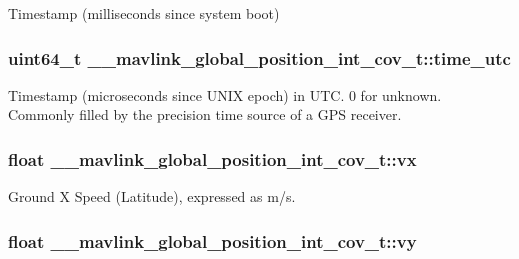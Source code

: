 Timestamp (milliseconds since system boot) 

\hypertarget{struct____mavlink__global__position__int__cov__t_af33a529c45f0078ac50c0af3d6fcc5c9}{
\subsubsection[{time\+\_\+utc}]{\setlength{\rightskip}{0pt plus 5cm}uint64\+\_\+t \+\_\+\+\_\+mavlink\+\_\+global\+\_\+position\+\_\+int\+\_\+cov\+\_\+t\+::time\+\_\+utc}}\label{struct____mavlink__global__position__int__cov__t_af33a529c45f0078ac50c0af3d6fcc5c9}


Timestamp (microseconds since U\+N\+I\+X epoch) in U\+T\+C. 0 for unknown. Commonly filled by the precision time source of a G\+P\+S receiver. 

\hypertarget{struct____mavlink__global__position__int__cov__t_af5385abecc85392ad2428fa2e96c1da5}{
\subsubsection[{vx}]{\setlength{\rightskip}{0pt plus 5cm}float \+\_\+\+\_\+mavlink\+\_\+global\+\_\+position\+\_\+int\+\_\+cov\+\_\+t\+::vx}}\label{struct____mavlink__global__position__int__cov__t_af5385abecc85392ad2428fa2e96c1da5}


Ground X Speed (Latitude), expressed as m/s. 

\hypertarget{struct____mavlink__global__position__int__cov__t_a35289a43dbe67f4efd300a80c2c7cd31}{
\subsubsection[{vy}]{\setlength{\rightskip}{0pt plus 5cm}float \+\_\+\+\_\+mavlink\+\_\+global\+\_\+position\+\_\+int\+\_\+cov\+\_\+t\+::vy}}\label{struct____mavlink__global__position__int__cov__t_a35289a43dbe67f4efd300a80c2c7cd31}



